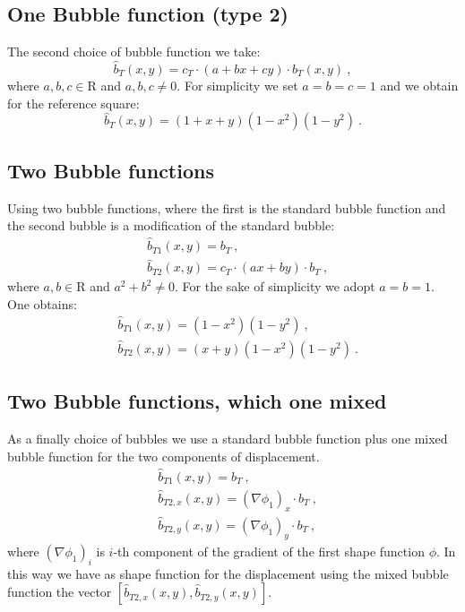 \documentclass[a4paper,11pt]{article}
\begin{document}
\subsection{One Bubble function (type 2)}
The second choice of bubble function we take:
\begin{equation}\label{eq:bubble_2}
\hat{b}_{T}(x,y) = c_{T}\cdot (a+bx+cy)\cdot b_{T}(x,y)\:,
\end{equation}
where $a,b,c \in \mathrm{R}$ and $a,b,c \neq 0$.
For simplicity we set $a=b=c=1$ and we obtain for the reference square:
\begin{equation}\label{eq:bubble_2_ref}
\hat{b}_{T}(x,y) = (1+x+y)(1-x^{2})(1-y^{2})\:.
\end{equation} 

\subsection{Two Bubble functions}
Using two bubble functions, where the first is the standard bubble function and the second bubble is a modification of the standard bubble:
\begin{equation}\label{eq:bubble_3}
\begin{split}
&\hat{b}_{T1}(x,y) = b_{T}\:, \\
&\hat{b}_{T2}(x,y) = c_{T}\cdot (ax+by)\cdot b_{T}\:,
\end{split}
\end{equation}
where $a,b \in \mathrm{R}$ and $a^{2}+b^{2}\neq 0$.
For the sake of simplicity we adopt $a=b=1$.
One obtains:
\begin{equation}\label{eq:bubble_3_ref}
\begin{split}
&\hat{b}_{T1}(x,y) = (1-x^{2})(1-y^{2})\:, \\
&\hat{b}_{T2}(x,y) = (x+y)(1-x^{2})(1-y^{2})\:.
\end{split}
\end{equation}

\subsection{Two Bubble functions, which one mixed}
As a finally choice of bubbles we use a standard bubble function plus one mixed bubble function for the two components of displacement.
\begin{equation}
\begin{split}
&\hat{b}_{T1}(x,y) = b_{T}\:, \\
&\hat{b}_{T2,x}(x,y) = (\nabla \phi_{1})_{x}\cdot b_{T}\:, \\
&\hat{b}_{T2,y}(x,y) = (\nabla \phi_{1})_{y}\cdot b_{T}\:,
\end{split}
\end{equation}
where $(\nabla\phi_{1})_{i}$ is $i$-th component of the gradient of the first shape function $\phi$.
In this way we have as shape function for the displacement using the mixed bubble function the vector $\left[\hat{b}_{T2,x}(x,y),\hat{b}_{T2,y}(x,y)\right]$. 
\end{document}
